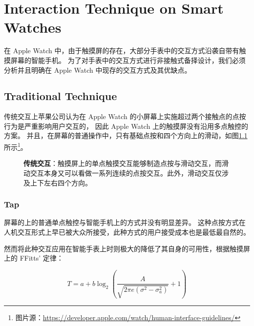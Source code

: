 \chapter{Interaction Technique on Smart Watches}

\quad\quad 在 Apple Watch 中，由于触摸屏的存在，大部分手表中的交互方式沿袭自带有触摸屏幕的智能手机\cite{WatchGuidelines:2016}。
为了对手表中的交互方式进行非接触式备择设计，我们必须分析并且明确在 Apple Watch 中现存的交互方式及其优缺点。

\section{Traditional Technique}

传统交互上苹果公司认为在 Apple Watch 的小屏幕上实施超过两个接触点的点按行为是严重影响用户交互的，
因此 Apple Watch 上的触摸屏没有沿用多点触控的方案。
并且，在屏幕的普通操作中，只有基础点按和四个方向上的滑动，如图\ref{fig:gesture}所示\footnote{图片源：\url{https://developer.apple.com/watch/human-interface-guidelines/}}。

\begin{figure}[H]
    \kaishu
    \centering
    \caption{\textbf{传统交互}：触摸屏上的单点触摸交互能够制造点按与滑动交互，而滑动交互本身又可以看做一系列连续的点按交互。此外，滑动交互仅涉及上下左右四个方向。}
    \label{fig:gesture}
\end{figure}

\subsection{Tap}

屏幕的上的普通单点触控与智能手机上的方式并没有明显差异。
这种点按方式在人机交互形式上早已被大众所接受，此种方式的用户接受成本也是最低最自然的。

然而将此种交互应用在智能手表上时则极大的降低了其自身的可用性，根据触摸屏上的 FFitts' 定律\cite{Bi:2013:FLM:2470654.2466180}：

\begin{equation}
T=a+b\log_{2}{\left(\frac{A}{\sqrt{2\pi e(\sigma^2-\sigma_{a}^2)}}+1 \right)}
\end{equation}

